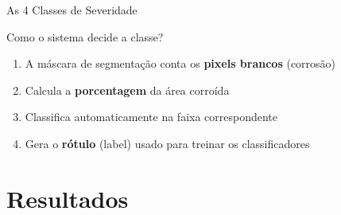 \documentclass[aspectratio=169, 12pt]{beamer}
\begin{document}
\begin{frame}{As 4 Classes de Severidade}
    \vspace{0.3cm}

    \begin{block}{Como o sistema decide a classe?}
        \begin{enumerate}
            \item A máscara de segmentação conta os \textbf{pixels brancos} (corrosão)
            \item Calcula a \textbf{porcentagem} da área corroída
            \item Classifica automaticamente na faixa correspondente
            \item Gera o \textbf{rótulo} (label) usado para treinar os classificadores
        \end{enumerate}
    \end{block}
\end{frame}

\section{Resultados}
\end{document}
